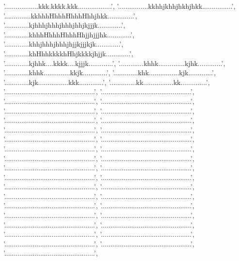   '..................kkk.kkkk.kkk..................',
  '................kkhhjkhhjhkhjhkk................',
  '..............kkhhhHhhhHhhhHhhjhkk..............',
  '.............kjhhhjhhhjhhhjhhjkjjjk.............',
  '.............khhhHhhhHhhhHhjjhjjjhk.............',
  '.............khhjhhhjhhhjhjjkjjjkjk.............',
  '.............khHhhkkkkhHhjkkkkjhjjk.............',
  '.............kjhhk....kkkk....kjjjk.............',
  '.............khhk..............kjhk.............',
  '.............khhk..............kkjk.............',
  '.............khk................kjk.............',
  '.............kjk................kkk.............',
  '..............kk................kk..............',
  '................................................',
  '................................................',
  '................................................',
  '................................................',
  '................................................',
  '................................................',
  '................................................',
  '................................................',
  '................................................',
  '................................................',
  '................................................',
  '................................................',
  '................................................',
  '................................................',
  '................................................',
  '................................................',
  '................................................',
  '................................................',
  '................................................',
  '................................................',
  '................................................',
  '................................................',
  '................................................',
  '................................................',
  '................................................',
  '................................................',
  '................................................',
  '................................................',
  '................................................',
  '................................................',
  '................................................',
  '................................................',
  '................................................',
  '................................................',
  '................................................',
